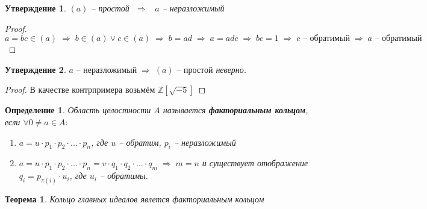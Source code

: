 \documentclass[12pt, a4paper]{article}
\newcommand{\ra}{\;\Rightarrow\;}
\newcommand{\Z}{\mathds{Z}}
\theoremstyle{plain}
\newtheorem*{Th*}{Теорема}
\newtheorem{Def}{Определение}
\newtheorem*{Statement*}{Утверждение}
\theoremstyle{definition}
\begin{document}
\begin{Statement*}
    $(a)$ -- простой $\ra\;\; a$ -- неразложимый 
\end{Statement*}
\begin{proof}
    $a = bc\in (a)\ra b\in (a) \vee c\in(a)\ra b = ad\ra a=adc \ra bc = 1 \ra c\text{ -- обратимый} \ra a\text{ -- обратимый}$\\
\end{proof}
\begin{Statement*}
    $a\text{ -- неразложимый} \ra (a) \text{ -- простой}$ неверно.
\end{Statement*}
\begin{proof}
    В качестве контрпримера возьмём $\Z[\sqrt{-5}]$
\end{proof}
\begin{Def}
    Область целостности $A$ называется \textbf{факториальным кольцом}, если $\forall 0\neq a\in A:$
    \begin{enumerate}
        \item $ a = u\cdot p_1\cdot p_2\cdot...\cdot p_n$, где $u$ -- обратим, $p_i$ -- неразложимый
        \item $ a = u\cdot p_1\cdot p_2\cdot...\cdot p_n = v\cdot q_1\cdot q_2\cdot...\cdot q_m\ra m=n$ и существует отображение $q_i = p_{\pi(i)}\cdot u_i$, где $u_i$ -- обратимы.
    \end{enumerate}
\end{Def}
\begin{Th*}
    Кольцо главных идеалов явлется факториальным кольцом
\end{Th*}
\end{document}
